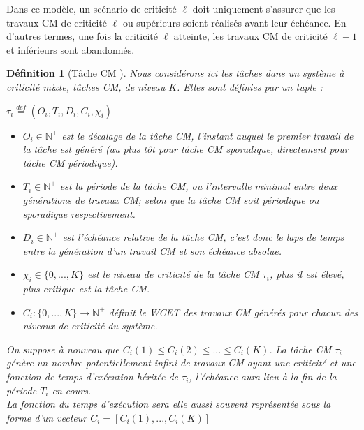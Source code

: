 \documentclass[12pt,a4paper,oneside]{book}
\theoremstyle{break}
\newtheorem{defin}{Définition}[chapter]
\theoremstyle{breakplain}
\begin{document}
Dans ce modèle, un scénario de criticité $\ell$ doit uniquement s'assurer que les travaux CM de criticité $\ell$ ou supérieurs soient réalisés avant leur échéance. En d'autres termes, une fois la criticité $\ell$ atteinte, les travaux CM de criticité $\ell-1$ et inférieurs sont abandonnés.\\

\pagebreak

\begin{defin}[Tâche CM \cite{BaruahBDMSS11}]
Nous considérons ici les tâches dans un système à criticité mixte, tâches CM, de niveau $K$. Elles sont définies par un tuple :
\begin{center}
$\tau_i \overset{def}{=} (O_i, T_i, D_i, C_i, \chi_i)$\\
\end{center}
\begin{itemize}
\item $O_i \in \mathbb{N}^{+}$ est le décalage de la tâche CM, l'instant auquel le premier travail de la tâche est généré (au plus tôt pour tâche CM sporadique, directement pour tâche CM périodique).

\item $T_i \in \mathbb{N}^{+}$ est la période de la tâche CM, ou l'intervalle minimal entre deux générations de travaux CM; selon que la tâche CM soit périodique ou sporadique respectivement.

\item $D_i \in \mathbb{N}^{+}$ est l'échéance relative de la tâche CM, c'est donc le laps de temps entre la génération d'un travail CM et son échéance absolue.

\item $\chi_i \in \{0, ..., K\}$ est le niveau de criticité de la tâche CM $\tau_i$, plus il est élevé, plus critique est la tâche CM.\\

\item $C_i : \{0, ..., K\} \rightarrow \mathbb{N}^{+}$ définit le WCET des travaux CM générés pour chacun des niveaux de criticité du système.
\end{itemize}

On suppose à nouveau que $C_i(1) \leq C_i(2) \leq ... \leq C_i(K)$. La tâche CM $\tau_i$ génère un nombre potentiellement infini de travaux CM ayant une criticité et une fonction de temps d'exécution héritée de $\tau_i$, l'échéance aura lieu à la fin de la période $T_i$ en cours.\\

La fonction du temps d'exécution sera elle aussi souvent représentée sous la forme d'un vecteur $C_i = [C_i(1), ..., C_i(K)]$\\
\end{defin}
\end{document}
